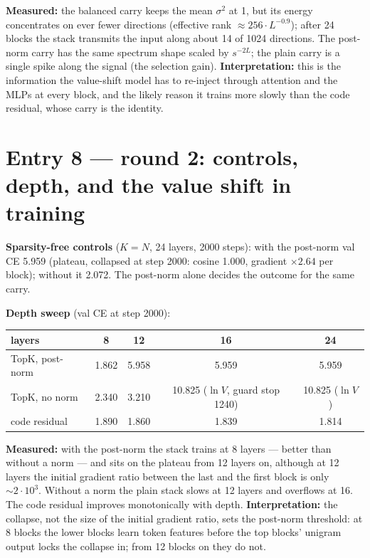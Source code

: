 \documentclass[11pt,a4paper]{article}
\begin{document}
\textbf{Measured:} the balanced carry keeps the mean \(\sigma^2\) at 1, but its energy
concentrates on ever fewer directions (effective rank \(\approx 256\cdot L^{-0.9}\));
after 24 blocks the stack transmits the input along about 14 of 1024 directions.
The post-norm carry has the same spectrum shape scaled by \(s^{-2L}\); the plain
carry is a single spike along the signal (the selection gain).
\textbf{Interpretation:} this is the information the value-shift model has to
re-inject through attention and the MLPs at every block, and the likely reason it
trains more slowly than the code residual, whose carry is the identity.



\section{Entry 8 --- round 2: controls, depth, and the value shift in training}

\textbf{Sparsity-free controls} (\(K=N\), 24 layers, 2000 steps): with the post-norm val CE 5.959
(plateau, collapsed at step 2000: cosine 1.000, gradient \(\times2.64\) per block); without it 2.072.
The post-norm alone decides the outcome for the same carry.

\textbf{Depth sweep} (val CE at step 2000):

\begin{center}\small
\begin{tabular}{lcccc}
\toprule
layers & 8 & 12 & 16 & 24 \\
\midrule
TopK, post-norm & 1.862 & 5.958 & 5.959 & 5.959 \\
TopK, no norm   & 2.340 & 3.210 & 10.825 (\(\ln V\), guard stop 1240) & 10.825 (\(\ln V\)) \\
code residual   & 1.890 & 1.860 & 1.839 & 1.814 \\
\bottomrule
\end{tabular}
\end{center}

\textbf{Measured:} with the post-norm the stack trains at 8 layers --- better than without a norm --- and
sits on the plateau from 12 layers on, although at 12 layers the initial gradient ratio between the last
and the first block is only \(\sim2\cdot10^3\).  Without a norm the plain stack slows at 12 layers and
overflows at 16.  The code residual improves monotonically with depth.
\textbf{Interpretation:} the collapse, not the size of the initial gradient ratio, sets the post-norm
threshold: at 8 blocks the lower blocks learn token features before the top blocks' unigram output locks
the collapse in; from 12 blocks on they do not.
\end{document}
